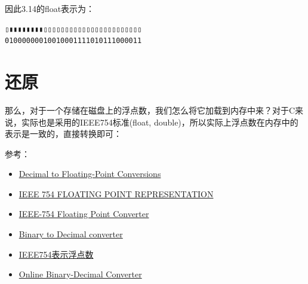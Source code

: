 \documentclass[12pt]{article}
\begin{document}
因此3.14的float表示为：

\begin{verbatim}
▯▮▮▮▮▮▮▮▮▯▯▯▯▯▯▯▯▯▯▯▯▯▯▯▯▯▯▯▯▯▯▯
01000000010010001111010111000011
\end{verbatim}

\section{还原}\label{ux8fd8ux539f}

那么，对于一个存储在磁盘上的浮点数，我们怎么将它加载到内存中来？对于C来说，实际也是采用的IEEE754标准(float, double)，所以实际上浮点数在内存中的表示是一致的，直接转换即可：

\begin{Shaded}
\begin{Highlighting}[]
\OperatorTok{\{}
        \OperatorTok{;}
         \OperatorTok{\&}\OperatorTok{()}  \OperatorTok{\{}
             \OperatorTok{*}\OperatorTok{\textless{}} \OperatorTok{*\textgreater{}(\&}\OperatorTok{);}
        \OperatorTok{\}}
    \OperatorTok{\};}
\end{Highlighting}
\end{Shaded}

参考：

\begin{itemize}
\tightlist
\item
  \href{http://sandbox.mc.edu/~bennet/cs110/flt/dtof.html}{Decimal to Floating-Point Conversions}
\item
  \href{http://cs.boisestate.edu/~alark/cs354/lectures/ieee754.pdf}{IEEE 754 FLOATING POINT REPRESENTATION}
\item
  \href{https://www.h-schmidt.net/FloatConverter/IEEE754.html}{IEEE-754 Floating Point Converter}
\item
  \href{https://www.rapidtables.com/convert/number/binary-to-decimal.html}{Binary to Decimal converter}
\item
  \href{https://www.jianshu.com/p/e5d72d764f2f}{IEEE754表示浮点数}
\item
  \href{http://www.binaryconvert.com/result_double.html?decimal=050057046051052051055053}{Online Binary-Decimal Converter}
\end{itemize}
\end{document}
